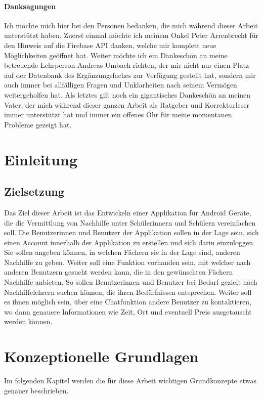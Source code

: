 \documentclass[a4paper,11pt]{report}
\begin{document}
	\subsubsection*{Danksagungen}
	Ich möchte mich hier bei den Personen bedanken, die mich während dieser Arbeit unterstützt haben. Zuerst einmal möchte ich meinem Onkel Peter Arrenbrecht für den Hinweis auf die Firebase API danken, welche mir komplett neue Möglichkeiten geöffnet hat. Weiter möchte ich ein Dankeschön an meine betreuende Lehrperson Andreas Umbach richten, der mir nicht nur einen Platz auf der Datenbank des Ergänzungsfaches zur Verfügung gestellt hat, sondern mir auch immer bei allfälligen Fragen und Unklarheiten nach seinem Vermögen weitergeholfen hat. Als letztes gilt noch ein gigantisches Dankeschön an meinen Vater, der mich während dieser ganzen Arbeit als Ratgeber und Korrekturleser immer unterstützt hat und immer ein offenes Ohr für meine momentanen Probleme gezeigt hat.

	\tableofcontents
	
	
	\chapter{Einleitung}
		\section{Zielsetzung}
		Das Ziel dieser Arbeit ist das Entwickeln einer Applikation für Android Geräte, die die Vermittlung von Nachhilfe unter Schülerinnern und Schülern vereinfachen soll. Die Benutzerinnen und Benutzer der Applikation sollen in der Lage sein, sich einen Account innerhalb der Applikation zu erstellen und sich darin einzuloggen. Sie sollen angeben können, in welchen Fächern sie in der Lage sind, anderen Nachhilfe zu geben. Weiter soll eine Funktion vorhanden sein, mit welcher nach anderen Benutzern gesucht werden kann, die in den gewünschten Fächern Nachhilfe anbieten. So sollen Benutzerinnen und Benutzer bei Bedarf gezielt nach Nachhilfelehrern suchen können, die ihren Bedürfnissen entsprechen. Weiter soll es ihnen möglich sein, über eine Chatfunktion andere Benutzer zu kontaktieren, wo dann genauere Informationen wie Zeit, Ort und eventuell Preis ausgetauscht werden können.
	
	\chapter{Konzeptionelle Grundlagen} \label{konzepte}
	Im folgenden Kapitel werden die für diese Arbeit wichtigen Grundkonzepte etwas genauer beschrieben.
\end{document}
